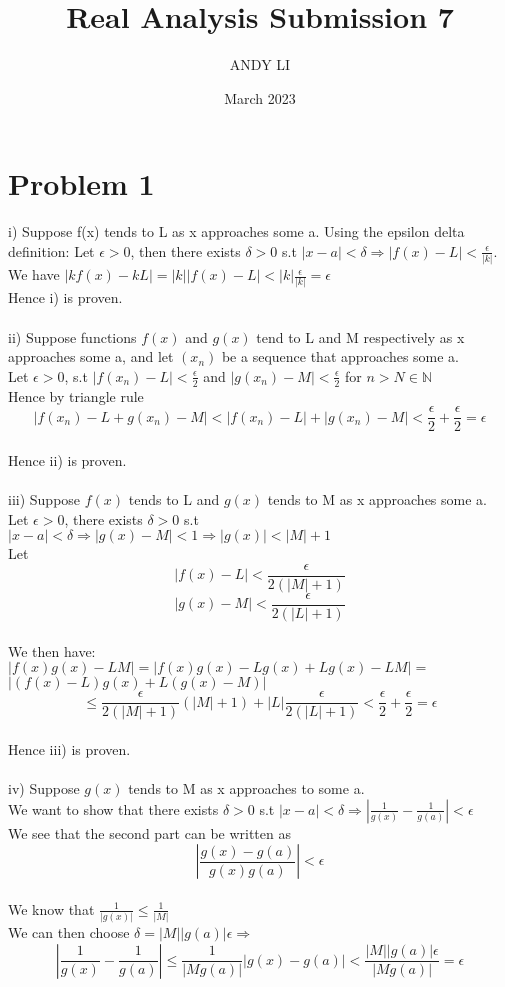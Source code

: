 \documentclass{article}
\title{Real Analysis Submission 7}
\author{ANDY LI}
\date{March 2023}
\begin{document}
\maketitle
\section*{Problem 1}
i) Suppose f(x) tends to L as x approaches some a. Using the epsilon delta definition: Let $\epsilon > 0$, then there exists $\delta > 0$ s.t $|x - a| < \delta \Rightarrow |f(x) - L| < \frac{\epsilon}{|k|}$.
\\We have $|kf(x) - kL| = |k||f(x)-L| < |k|\frac{\epsilon}{|k|} = \epsilon$
\\Hence i) is proven.
\\
\\ii) Suppose functions $f(x)$ and $g(x)$ tend to L and M respectively as x approaches some a, and let $(x_n)$ be a sequence that approaches some a.
\\Let $\epsilon > 0$, s.t $|f(x_n) - L| < \frac{\epsilon}{2}$ and $|g(x_n) - M| < \frac{\epsilon}{2}$ for $n > N \in \mathbb{N}$
\\Hence by triangle rule $$|f(x_n) - L + g(x_n) - M| < |f(x_n)-L| + |g(x_n) - M| < \frac{\epsilon}{2} + \frac{\epsilon}{2} = \epsilon$$
\\Hence ii) is proven.
\\
\\iii) Suppose $f(x)$ tends to L and $g(x)$ tends to M as x approaches some a.
\\Let $\epsilon > 0$, there exists $\delta > 0$ s.t $|x - a| < \delta \Rightarrow |g(x) - M| < 1 \Rightarrow |g(x)| < |M| + 1$
\\Let $$|f(x) - L| < \frac{\epsilon}{2(|M|+1)}$$ $$|g(x)-M| < \frac{\epsilon}{2(|L|+1)}$$
\\We then have: $|f(x)g(x) - LM| = |f(x)g(x) - Lg(x) + Lg(x) - LM| =$ \\$ |(f(x) - L)g(x) + L(g(x)-M)|$
$$\leq \frac{\epsilon}{2(|M|+1)}(|M|+1) + |L|\frac{\epsilon}{2(|L|+1)} < \frac{\epsilon}{2} + \frac{\epsilon}{2} = \epsilon$$
\\Hence iii) is proven.
\\
\\iv) Suppose $g(x)$ tends to M as x approaches to some a.
\\We want to show that there exists $\delta > 0$ s.t $|x - a| < \delta \Rightarrow |\frac{1}{g(x)} - \frac{1}{g(a)}| < \epsilon$
\\We see that the second part can be written as $$|\frac{g(x)-g(a)}{g(x)g(a)}| < \epsilon$$
\\We know that $\frac{1}{|g(x)|} \leq \frac{1}{|M|}$
\\We can then choose $\delta = |M||g(a)|\epsilon \Rightarrow$ $$|\frac{1}{g(x)} - \frac{1}{g(a)}| \leq \frac{1}{|Mg(a)|}|g(x)-g(a)| < \frac{|M||g(a)|\epsilon}{|Mg(a)|} = \epsilon$$
\end{document}
